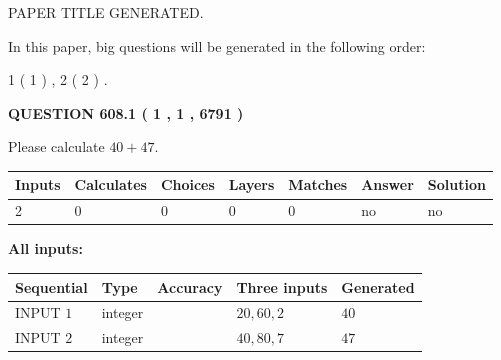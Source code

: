 \documentclass[12pt]{article}
\begin{document}
   
\vspace{0.2in}
   
   
   
   
   
   
   
   
 \vspace{0.2in}
 
 
 
 
   
   
 PAPER TITLE GENERATED.
   
   
   
\vspace{0.2in}
   
In this paper, big questions will be generated in the following order: 
   
   
   1 ( 1 )
 ,
   2 ( 2 )
 .
  
\vspace{0.2in}
  
{\textbf{\Large{QUESTION
608.1 
 ( 1 , 1 , 6791 )
}}}
  
  
 
Please calculate $ %
40 +  %
47 $.
 
 
   
   
   
   
\noindent\begin{tabular}{|l|l|l|l|l|l|l|}
 \hline
Inputs & Calculates & Choices & Layers & Matches & Answer & Solution \\ \hline
 2  & 
 0  & 
 0
  & 
 0  & 
 0  & 
  no & 
  no 
  \\ \hline
 \end{tabular}
   
   
   
   
\noindent{}
   
   
   
   
\noindent\vspace{0.1in}\hspace{-0.08in} {\textbf{\Large{All inputs: }}}
   
   
  
  
\noindent\begin{tabular}{|l|l|l|l|l|}
\hline
 Sequential & Type & Accuracy & Three inputs & Generated \\ 
\hline
 
 
  INPUT $  1 $ & integer &  & $
 20
 , 
 60
 , 
 2
 $ & $ 40 $ 
 \\  \hline  
 
 
  INPUT $  2 $ & integer &  & $
 40
 , 
 80
 , 
 7
 $ & $ 47 $ 
 \\  \hline  
 \end{tabular}
   
\end{document}
